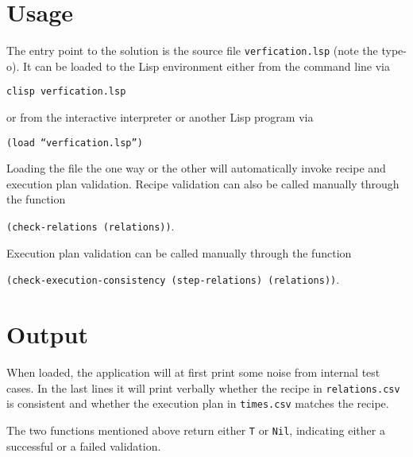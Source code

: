   \section{Usage}
    
    The entry point to the solution is the source file \texttt{verfication.lsp}
    (note the type-o). It can be loaded to the Lisp environment either from the
    command line via
    
    \begin{center}
        \texttt{clisp verfication.lsp}
    \end{center}
    
    or from the interactive interpreter or another Lisp program via
    
    \begin{center}\texttt{(load ``verfication.lsp'')}\end{center}
    
    Loading the file the one way or the other will automatically invoke recipe
    and execution plan validation. Recipe validation can also be called manually
    through the function 
    
    \begin{center}\texttt{(check-relations (relations))}.\end{center}
    
    Execution plan
    validation can be called manually through the function
    
    \begin{center}\texttt{(check-execution-consistency (step-relations)
    (relations))}.\end{center}
  
  \section{Output}
    
    When loaded, the application will at first print some noise from internal
    test cases.
    In the last lines it will print verbally whether the recipe in
    \texttt{relations.csv} is consistent and whether the execution plan in
    \texttt{times.csv} matches the recipe.
    
    The two functions mentioned above return either \texttt{T} or \texttt{Nil},
    indicating either a successful or a failed validation.
